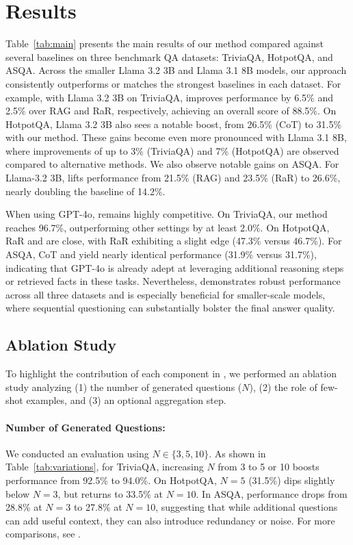 
\section{Results}
\label{sec:results}

Table~\ref{tab:main} presents the main results of our method compared against several baselines on three benchmark QA datasets: TriviaQA, HotpotQA, and ASQA. Across the smaller Llama 3.2 3B and Llama 3.1 8B models, our approach consistently outperforms or matches the strongest baselines in each dataset. For example, with Llama 3.2 3B on \mbox{TriviaQA}, \rephrase{} improves performance by 6.5\% and 2.5\% over RAG and RaR, respectively, achieving an overall score of 88.5\%. On HotpotQA, Llama 3.2 3B also sees a notable boost, from 26.5\% (CoT) to 31.5\% with our method. These gains become even more pronounced with Llama 3.1 8B, where improvements of up to 3\% (TriviaQA) and 7\% (HotpotQA) are observed compared to alternative methods. We also observe notable gains on ASQA. For Llama-3.2 3B, \rephrase{} lifts performance from 21.5\% (RAG) and 23.5\% (RaR) to 26.6\%, nearly doubling the baseline of 14.2\%. 

When using GPT-4o, \rephrase{} remains highly competitive. On TriviaQA, our method reaches 96.7\%, outperforming other settings by at least 2.0\%. On HotpotQA, RaR and \rephrase{} are close, with RaR exhibiting a slight edge (47.3\% versus 46.7\%). For ASQA, CoT and \rephrase{} yield nearly identical performance (31.9\% versus 31.7\%), indicating that GPT-4o is already adept at leveraging additional reasoning steps or retrieved facts in these tasks. Nevertheless, \rephrase{} demonstrates robust performance across all three datasets and is especially beneficial for smaller-scale models, where sequential questioning can substantially bolster the final answer quality.



\subsection{Ablation Study}
\label{sec:ablation-study}

To highlight the contribution of each component in \rephrase, we performed an ablation study analyzing (1) the number of generated questions ($N$), (2) the role of few-shot examples, and (3) an optional aggregation step.

\paragraph{Number of Generated Questions:}
We conducted an evaluation using $N\in\{3,5,10\}$. As shown in Table~\ref{tab:variations}, for TriviaQA, increasing $N$ from 3 to 5 or 10 boosts performance from 92.5\% to 94.0\%. On HotpotQA, $N\!=\!5$ (31.5\%) dips slightly below $N\!=\!3$, but returns to 33.5\% at $N\!=\!10$. In ASQA, performance drops from 28.8\% at $N\!=\!3$ to 27.8\% at $N\!=\!10$, suggesting that while additional questions can add useful context, they can also introduce redundancy or noise. For more comparisons, see .


